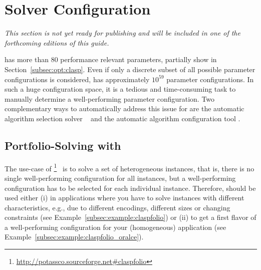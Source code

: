 
\section{Solver Configuration}
\label{sec:configuration}

\textit{This section is not yet ready for publishing
and will be included in one of the forthcoming editions of this guide.}

\clasp{} has more than $80$ performance relevant parameters, partially show in Section~\ref{subsec:opt:clasp}.
Even if only a discrete subset of all possible parameter configurations is considered,
\clasp{} has approximately $10^{59}$ parameter configurations.
In such a huge configuration space, 
it is a tedious and time-consuming task 
to manually determine a well-performing parameter configuration.
Two complementary ways to automatically address this issue for \clasp{} are 
the automatic algorithm selection solver \claspfolio{}~\cite{holisc14a} and 
the automatic algorithm configuration tool \piclasp{}.

\subsection{Portfolio-Solving with \claspfolio}
\label{sec:claspfolio}

The use-case of \claspfolio{}\footnote{\url{http://potassco.sourceforge.net\#claspfolio}}~\cite{holisc14a} 
is to solve a set of heterogeneous instances, that is,
there is no single well-performing configuration for all instances, 
but a well-performing configuration has to be selected for each individual instance.
Therefore, \claspfolio{} should be used either (i) 
in applications  where you have to solve instances with different characteristics, 
e.g., due to different encodings, different sizes or changing constraints 
(see Example~\ref{subsec:example:claspfolio})
or (ii) to get a first flavor of a well-performing configuration for your (homogeneous) application (see Example~\ref{subsec:example:claspfolio_oralce}). 

